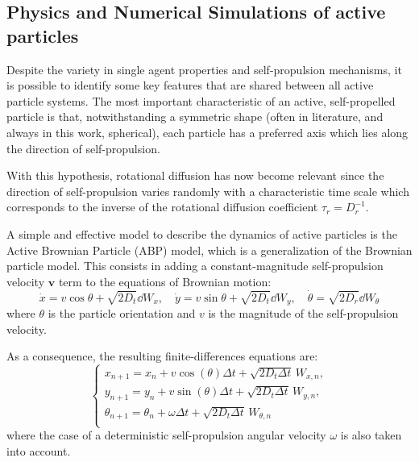 \documentclass[../../master_thesis_np.tex]{subfiles}
\begin{document}
	\subsection[ABP simulations]{Physics and Numerical Simulations of active particles}
		Despite the variety in single agent properties and self-propulsion mechanisms, it is possible to identify some key features that are shared between all active particle systems. 
		The most important characteristic of an active, self-propelled particle is that, notwithstanding a symmetric shape (often in literature, and always in this work, spherical), each particle has a preferred axis which lies along the direction of self-propulsion.
		
		With this hypothesis, rotational diffusion has now become relevant since the direction of self-propulsion varies randomly with a characteristic time scale which corresponds to the inverse of the rotational diffusion coefficient $\tau_r = D_r^{-1}$. 
		
		A simple and effective model to describe the dynamics of active particles is the Active Brownian Particle (ABP) model, which is a generalization of the Brownian particle model.
		This consists in adding a constant-magnitude self-propulsion velocity $\mathbf{v}$ term to the equations of Brownian motion:
		\begin{equation}
			\dot{x} = v \cos{\theta} + \sqrt{2D_t}\dd{W_x} , \quad \dot{y} = v \sin{\theta} + \sqrt{2D_t}\dd{W_y}, \quad \dot{\theta} = \sqrt{2D_r}\dd{W_{\theta}}
		\end{equation}
		where $\theta$ is the particle orientation and $v$ is the magnitude of the self-propulsion velocity.
		
		As a consequence, the resulting finite-differences equations are:
		\begin{equation} \label{eq:fin_diff1}
			\begin{cases}
				x_{n+1} = x_n + v \cos(\theta) \Delta t + \sqrt{2D_t \Delta t} \, W_{x,n},\\
				y_{n+1} = y_n + v \sin(\theta) \Delta t + \sqrt{2D_t \Delta t} \, W_{y,n},\\
				\theta_{n+1} = \theta_n + \omega \Delta t + \sqrt{2D_t \Delta t} \, W_{\theta,n}\\
			\end{cases}
		\end{equation}
		where the case of a deterministic self-propulsion angular velocity $\omega$ is also taken into account.
		
\end{document}
